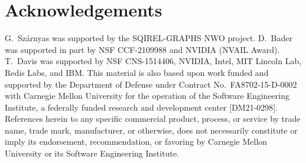 \section*{Acknowledgements}

G.~Sz\'arnyas was supported by the SQIREL-GRAPHS NWO project.
D.~Bader was supported in part by NSF CCF-2109988 and NVIDIA (NVAIL Award).
T.~Davis was supported by NSF CNS-1514406, NVIDIA, Intel, MIT Lincoln Lab,
Redis Labs, and IBM.
This material is also based upon work funded and supported by the Department of
Defense under Contract No.~FA8702-15-D-0002 with Carnegie Mellon University for
the operation of the Software Engineering Institute, a federally funded research
and development center [DM21-0298].
References herein to any specific commercial product, process, or service by trade name, trade mark, manufacturer, or otherwise, does not necessarily constitute or imply its endorsement, recommendation, or favoring by Carnegie Mellon University or its Software Engineering Institute.

